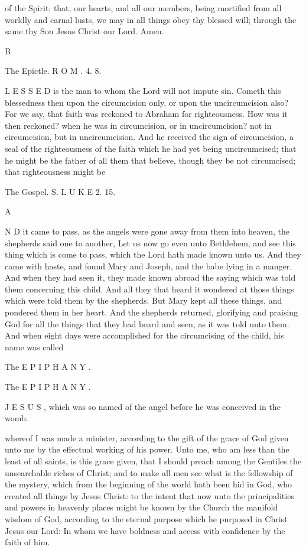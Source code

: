 of the Spirit; that, our hearts, and all our members, being mortified from all worldly and carnal lusts, we may in all things obey thy blessed will; through the same thy Son Jesus Christ our Lord. Amen.

B

The Epictle. R O M . 4. 8.

L E S S E D is the man to whom the Lord will not impute sin. Cometh this blessedness then upon the circumcision only, or upon the uncircumcision also? For we say, that faith was reckoned to Abraham for righteousness. How was it then reckoned? when he was in circumcision, or in uncircumcision? not in circumcision, but in uncircumcision. And he received the sign of circumcision, a seal of the righteousness of the faith which he had yet being uncircumcised; that he might be the father of all them that believe, though they be not circumcised; that righteousness might be

The Gospel. S. L U K E 2. 15.

A

N D it came to pass, as the angels were gone away from them into heaven, the shepherds said one to another, Let us now go even unto Bethlehem, and see this thing which is come to pass, which the Lord hath made known unto us. And they came with haste, and found Mary and Joseph, and the babe lying in a manger. And when they had seen it, they made known abroad the saying which was told them concerning this child. And all they that heard it wondered at those things which were told them by the shepherds. But Mary kept all these things, and pondered them in her heart. And the shepherds returned, glorifying and praising God for all the things that they had heard and seen, as it was told unto them. And when eight days were accomplished for the circumcising of the child, his name was called

The E P I P H A N Y .

The E P I P H A N Y .

J E S U S , which was so named of the angel before he was conceived in the womb.

whereof I was made a minister, according to the gift of the grace of God given unto me by the effectual working of his power. Unto me, who am less than the least of all saints, is this grace given, that I should preach among the Gentiles the unsearchable riches of Christ; and to make all men see what is the fellowship of the mystery, which from the beginning of the world hath been hid in God, who created all things by Jesus Christ: to the intent that now unto the principalities and powers in heavenly places might be known by the Church the manifold wisdom of God, according to the eternal purpose which he purposed in Christ Jesus our Lord: In whom we have boldness and access with confidence by the faith of him.

